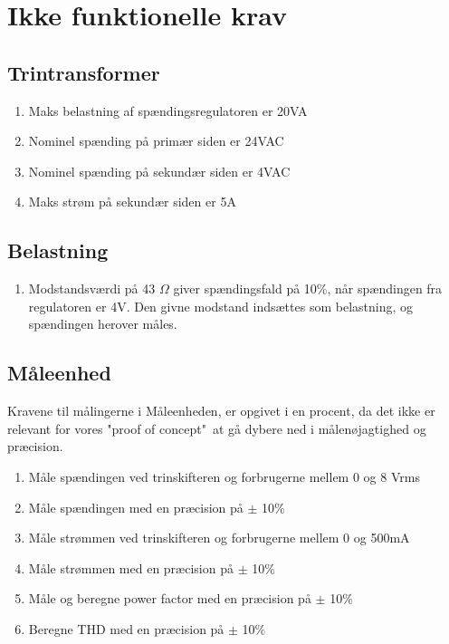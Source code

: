 
\section{Ikke funktionelle krav}

\subsection{Trintransformer}
\begin{enumerate}
	\item Maks belastning af spændingsregulatoren er 20VA
	\item Nominel spænding på primær siden er 24VAC
	\item Nominel spænding på sekundær siden er 4VAC
	\item Maks strøm på sekundær siden er 5A	
\end{enumerate}

\subsection{Belastning}
\begin{enumerate}
	\item Modstandsværdi på 43 $\Omega$ giver spændingsfald på 10\%, når spændingen fra regulatoren er 4V. Den givne modstand indsættes som belastning, og spændingen herover måles.
\end{enumerate}

\subsection{Måleenhed}
\label{subsec:ME}
Kravene til målingerne i Måleenheden, er opgivet i en procent, da det ikke er relevant for vores "proof of concept"\  at gå dybere ned i målenøjagtighed og præcision. 
\begin{enumerate}
	\item Måle spændingen ved trinskifteren og forbrugerne mellem 0 og 8 Vrms
	\item Måle spændingen med en præcision på $\pm$ 10\%
	\item Måle strømmen ved trinskifteren og forbrugerne mellem 0 og 500mA
	\item Måle strømmen med en præcision på $\pm$ 10\%
	\item Måle og beregne power factor med en præcision på $\pm$ 10$\%$
	\item Beregne THD med en præcision på $\pm$ 10$\%$
\end{enumerate}


